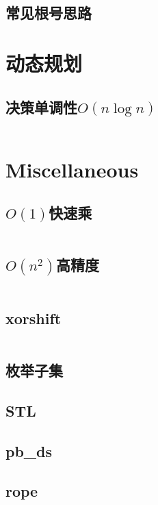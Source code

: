 \documentclass[a4paper]{article}
\begin{document}
\begin{multicols}{2}
				\subsection{常见根号思路}
					

			\section{动态规划}
				\subsection{决策单调性$O(n\log n)$}
					\inputminted{cpp}{../src/DP/决策单调性.cpp}

			\section{Miscellaneous}
				\subsection{$O(1)$快速乘}
					\inputminted{cpp}{../src/misc/O(1)快速乘.cpp}
				
				\subsection{$O(n^2)$高精度}
					\inputminted{cpp}{../src/misc/高精度.cpp}

				\subsection{xorshift}
					\inputminted{cpp}{../src/misc/xorshift.cpp}
				
				\subsection{枚举子集}
					
					
				\subsection{STL}
					

				\subsection{pb\_ds}


				\subsection{rope}
					


\end{multicols}
\end{document}
